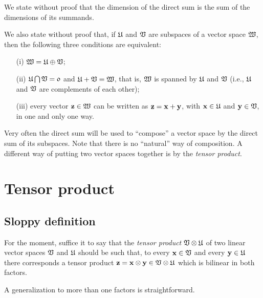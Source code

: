 We state without proof
that the dimension of the direct sum is the sum of the dimensions of its summands.

We also state without proof
that,
if
${\frak U}$
and
${\frak V}$
are subspaces of a vector space
${\frak W}$,
then the following three conditions are equivalent:
\begin{itemize}
\item[(i)]
${\frak W}={\frak U}\oplus{\frak V}$;
\item[(ii)]
${\frak U}\bigcap{\frak V}={\frak 0}$
and
${\frak U}+{\frak V}={\frak W}$, that is, ${\frak W}$ is spanned by ${\frak U}$ and ${\frak V}$
(i.e., ${\frak U}$
and
${\frak V}$
are complements of each other);
\item[(iii)]
every vector ${\bf z}\in {\frak W}$ can be written as
${\bf z}={\bf x}+{\bf y}$, with
${\bf x}\in {\frak U}$  and
${\bf y}\in {\frak V}$, in one and only one way.
\end{itemize}

Very often the direct sum will be used to ``compose'' a vector space by the direct sum of its subspaces.
Note that there is no ``natural'' way of composition.
A different way of putting two vector spaces together is by the {\em tensor product}.


\section{Tensor product}
\label{2011-m-tensorp}


\subsection{Sloppy definition}

For the moment, suffice it to say that
the {\em tensor product}
 ${\frak V} \otimes {\frak U}$
of two linear vector spaces  ${\frak V}$ and  ${\frak U}$
should be such that,
to every
${\bf x} \in  {\frak V}$
and every
${\bf y} \in  {\frak U}$
there corresponds a tensor product ${\bf z} = {\bf x} \otimes {\bf y}
\in {\frak V} \otimes {\frak U}$
which is bilinear in both factors.



A generalization to more than one factors is straightforward.

